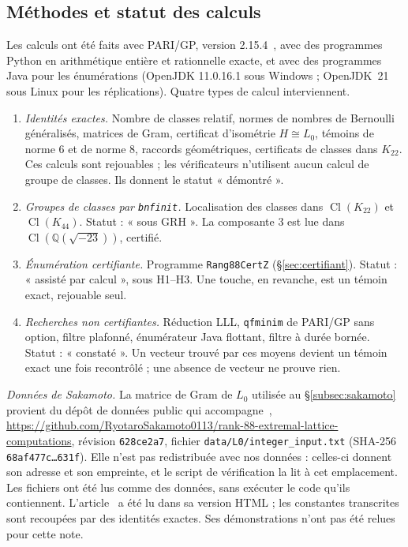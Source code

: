 \documentclass[11pt,a4paper]{amsart}
\theoremstyle{plain}
\theoremstyle{definition}
\numberwithin{equation}{section}
\newcommand{\Q}{\mathbb{Q}}
\DeclareMathOperator{\Cl}{Cl}
\newcommand{\Lz}{L_{0}}
\begin{document}
\subsection{Méthodes et statut des calculs}\label{subsec:methodes}
Les calculs ont été faits avec PARI/GP, version 2.15.4~\cite{PARI}, avec des programmes Python en arithmétique entière et rationnelle exacte, et avec des programmes Java pour les énumérations (OpenJDK 11.0.16.1 sous Windows ; OpenJDK~21 sous Linux pour les réplications). Quatre types de calcul interviennent.
\begin{enumerate}[label=\textup{(C\arabic*)}]
\item \emph{Identités exactes.} Nombre de classes relatif, normes de nombres de Bernoulli généralisés, matrices de Gram, certificat d'isométrie $H\cong\Lz$, témoins de norme $6$ et de norme $8$, raccords géométriques, certificats de classes dans $K_{22}$. Ces calculs sont rejouables ; les vérificateurs n'utilisent aucun calcul de groupe de classes. Ils donnent le statut « démontré ».
\item \emph{Groupes de classes par \texttt{bnfinit}.} Localisation des classes dans $\Cl(K_{22})$ et $\Cl(K_{44})$. Statut : « sous GRH ». La composante $3$ est lue dans $\Cl(\Q(\sqrt{-23}))$, certifié.
\item \emph{Énumération certifiante.} Programme \texttt{Rang88CertZ} (\S\ref{sec:certifiant}). Statut : « assisté par calcul », sous H1--H3. Une touche, en revanche, est un témoin exact, rejouable seul.
\item \emph{Recherches non certifiantes.} Réduction LLL, \texttt{qfminim} de PARI/GP sans option, filtre plafonné, énumérateur Java flottant, filtre à durée bornée. Statut : « constaté ». Un vecteur trouvé par ces moyens devient un témoin exact une fois recontrôlé ; une absence de vecteur ne prouve rien.
\end{enumerate}

\emph{Données de Sakamoto.} La matrice de Gram de $\Lz$ utilisée au \S\ref{subsec:sakamoto} provient du dépôt de données public qui accompagne~\cite{Sak26}, \url{https://github.com/RyotaroSakamoto0113/rank-88-extremal-lattice-computations}, révision \texttt{628ce2a7}, fichier \texttt{data/L0/integer\_input.txt} (SHA-256 \texttt{68af477c\dots631f}). Elle n'est pas redistribuée avec nos données : celles-ci donnent son adresse et son empreinte, et le script de vérification la lit à cet emplacement. Les fichiers ont été lus comme des données, sans exécuter le code qu'ils contiennent. L'article~\cite{Sak26} a été lu dans sa version HTML ; les constantes transcrites sont recoupées par des identités exactes. Ses démonstrations n'ont pas été relues pour cette note.
\end{document}
